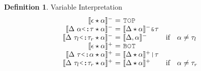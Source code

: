 \documentclass[acmsmall]{acmart}
\theoremstyle{definition}
\newtheorem{definition}{Definition}[section]
\begin{document}


\begin{definition} 
  \label{def:variable_interpretation}
  Variable Interpretation
  \hfill
  \small
  \boxed{
    \llbracket\Delta \star \alpha \rrbracket^\pm = \tau
  }
  \\
  \[
  \begin{array}[t]{r@{}c@{}lcl}

      \llbracket \epsilon \star \alpha \rrbracket^-
      &\ =\ & 
      \J{TOP}

      \\

      \llbracket \Delta \ \alpha  \J{<:} \tau \star \alpha \rrbracket^- 
      &\ =\ & 
      \llbracket \Delta \star \alpha \rrbracket^- \J{\&} \tau

      \\

      \llbracket \Delta \ \tau_l \J{<:} \tau_r \star \alpha \rrbracket^- 
      &\ =\ & 
      \llbracket \Delta, \alpha \rrbracket^-
      &\text{if}& 
      \begin{array}[t]{@{}l}
        \alpha \neq \tau_l
      \end{array}

      \\

      \llbracket \epsilon \star \alpha \rrbracket^+ 
      &\ =\ & 
      \J{BOT}

      \\

      \llbracket \Delta \  \tau \J{<:} \alpha \star \alpha \rrbracket^+ 
      &\ =\ & 
      \llbracket \Delta \star \alpha \rrbracket^+ \J{|} \tau

      \\

      \llbracket \Delta \ \tau_l \J{<:} \tau_r \star \alpha \rrbracket^+ 
      &\ =\ & 
      \llbracket \Delta \star \alpha \rrbracket^+
      &\text{if}& 
      \begin{array}[t]{@{}l}
        \alpha \neq \tau_r
      \end{array}
  \end{array}
  \]
\end{definition}
\end{document}

